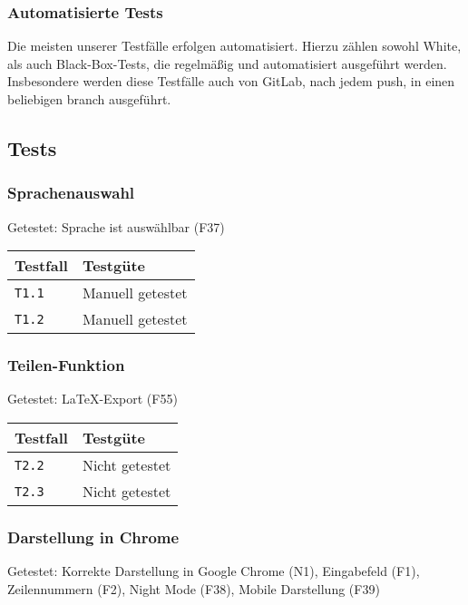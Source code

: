 \documentclass[parskip=full,11pt,twoside]{scrartcl}
\newcommand{\testline}[2]{
    \texttt{#1} & 
    \ifthenelse{\equal{#2}{Nicht getestet}}
        {\cellcolor{red!20}}
        {}
    \ifthenelse{\equal{#2}{Manuell getestet}}
        {\cellcolor{LimeGreen!20}}
        {}
    \ifthenelse{\equal{#2}{Automatisiert getestet}}
        {\cellcolor{green!20}}
        {}
    #2 \\ \hline
}
\begin{document}
\subsubsection{Automatisierte Tests}
Die meisten unserer Testfälle erfolgen automatisiert.
Hierzu zählen sowohl White, als auch Black-Box-Tests, die regelmäßig und automatisiert ausgeführt werden.
Insbesondere werden diese Testfälle auch von GitLab, nach jedem push, in einen beliebigen branch ausgeführt.

\subsection{Tests}

\subsubsection{Sprachenauswahl}
    Getestet:
    Sprache ist auswählbar (F37)

    \label{shortcuts}
    \begin{center}
        \begin{tabular}{ p{9cm} p{4cm}}
            Testfall & Testgüte \\ \hline
            \testline{T1.1}{Manuell getestet}
            \testline{T1.2}{Manuell getestet}
        \end{tabular}
    \end{center}

\subsubsection{Teilen-Funktion}
    Getestet:
    LaTeX-Export (F55)

    \label{shortcuts}
    \begin{center}
        \begin{tabular}{ p{9cm} p{4cm}}
            Testfall & Testgüte \\ \hline
            \testline{T2.2}{Nicht getestet}
            \testline{T2.3}{Nicht getestet}
        \end{tabular}
    \end{center}

\subsubsection{Darstellung in Chrome}
    Getestet:
    Korrekte Darstellung in Google Chrome (N1),
    Eingabefeld (F1),
    Zeilennummern (F2),
    Night Mode (F38),
    Mobile Darstellung (F39)
\end{document}
